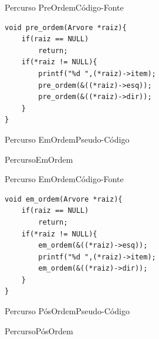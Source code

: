 \documentclass[aspectratio=169]{beamer}
\begin{document}
\begin{frame}[fragile]{Percurso PreOrdem}{Código-Fonte}
\begin{lstlisting}[style=CStyle,basicstyle=\small]
void pre_ordem(Arvore *raiz){
    if(raiz == NULL)
        return;
    if(*raiz != NULL){
        printf("%d ",(*raiz)->item);
        pre_ordem(&((*raiz)->esq));
        pre_ordem(&((*raiz)->dir));
    }
}
\end{lstlisting}  
\end{frame}


\begin{frame}{Percurso EmOrdem}{Pseudo-Código}
\begin{algorithm}[H]
\caption{PercursoEmOrdem} 
\label{PercursoEmOrdem}
\end{algorithm}
\end{frame}


\begin{frame}[fragile]{Percurso EmOrdem}{Código-Fonte}
\begin{lstlisting}[style=CStyle,basicstyle=\small]
void em_ordem(Arvore *raiz){
    if(raiz == NULL)
        return;
    if(*raiz != NULL){
        em_ordem(&((*raiz)->esq));
        printf("%d ",(*raiz)->item);
        em_ordem(&((*raiz)->dir));
    }
}
\end{lstlisting}  
\end{frame}


\begin{frame}{Percurso PósOrdem}{Pseudo-Código}
\begin{algorithm}[H]
\caption{PercursoPósOrdem} 
\label{PercursoPosOrdem}
\end{algorithm}
\end{frame}
\end{document}
